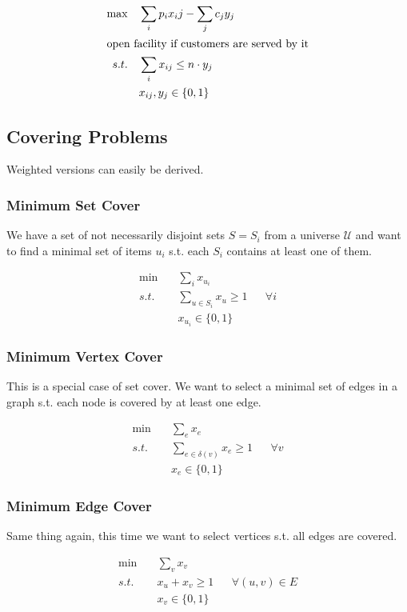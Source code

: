 \begin{align*}
\max \quad & \sum_i p_i x_ij - \sum_{j} c_j y_j\\
\intertext{open facility if customers are served by it}
s.t. \quad & \sum_{i} x_{ij} \leq n\cdot y_j\\
	& x_{ij},y_j \in \{0,1\}
\end{align*}

\subsection{Covering Problems}

Weighted versions can easily be derived.

\subsubsection{Minimum Set Cover}

We have a set of not necessarily disjoint sets $S=S_i$ from a universe $\mathcal{U}$ and want to find a minimal set of items $u_i$ s.t. each $S_i$ contains at least one of them.

\begin{align*}
\min \quad & \sum_i x_{u_i}\\
s.t. \quad & \sum_{u\in S_i} x_{u} \geq 1 && \forall i\\
	& x_{u_i} \in \{0,1\}
\end{align*}

\subsubsection{Minimum Vertex Cover}

This is a special case of set cover. We want to select a minimal set of edges in a graph s.t. each node is covered by at least one edge.

\begin{align*}
\min \quad & \sum_e x_e \\
s.t. \quad & \sum_{e\in \delta(v)} x_e \geq 1 && \forall v\\
	& x_{e} \in \{0,1\}
\end{align*}
\subsubsection{Minimum Edge Cover}

Same thing again, this time we want to select vertices s.t. all edges are covered.

\begin{align*}
\min \quad & \sum_v x_v \\
s.t. \quad & x_u+x_v \geq 1 && \forall (u,v) \in E\\
	& x_v \in \{0,1\}
\end{align*}

